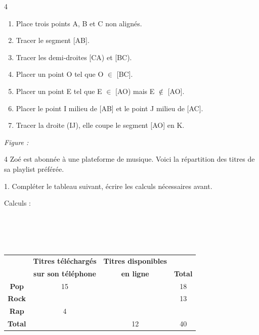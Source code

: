 \documentclass[a4paper]{book}
\begin{document}
{    \begin{exerciceNote}{4}
         \begin{minipage}{0.5\linewidth}
            \begin{enumerate}
                \item Place trois points A, B et C non alignés.
                \item Tracer le segment [AB].
                \item Tracer les demi-droites [CA) et [BC).
                \item Placer un point O tel que O $\in$ [BC].
                \item Placer un point E tel que E $\in$ [AO) mais E $\notin$ [AO].
                \item Placer le point I milieu de [AB] et le point J milieu de [AC].
                \item Tracer la droite (IJ), elle coupe le segment [AO] en K.
            \end{enumerate}
        \end{minipage}
        \vline
        \hfill
        \begin{minipage}{0.49\linewidth}
            \textit{Figure : }

            \vspace{6cm}
        
        \end{minipage}
    \end{exerciceNote}


    \begin{exerciceNote}{4}
        Zoé est abonnée à une plateforme de musique. Voici la répartition des titres de sa playlist préférée.

        1. Compléter le tableau suivant, écrire les calculs nécessaires avant.

        \medskip
    
        Calculs :  \points[35] \\ \points[40] \\ \points[40] \\ \points[40] \\ \points[40] \\ \points[40]
        
        \begin{center}
            \begin{tabular}{|c|c|c|c|}
                \hline
                 & \textbf{Titres téléchargés} & \textbf{Titres disponibles} & \\
                 & \textbf{sur son téléphone} & \textbf{en ligne} & \textbf{Total} \\
                \hline
                \textbf{Pop} & 15 & & 18 \\
                \hline
                \textbf{Rock} & & & 13 \\
                \hline
                \textbf{Rap} & 4 & & \\
                \hline
                \textbf{Total} & & 12 & 40 \\
                \hline
            \end{tabular}
        \end{center}


\end{exerciceNote}}
\end{document}
